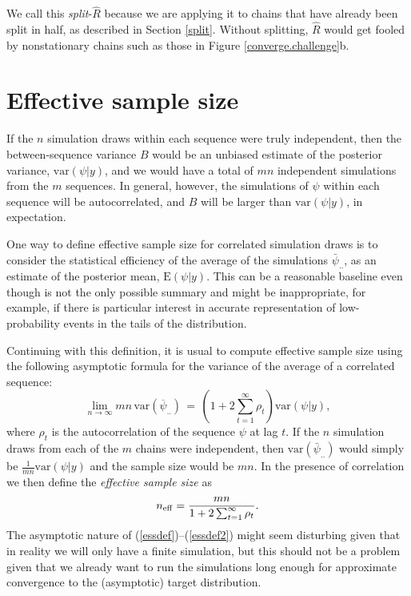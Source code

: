 \documentclass[11pt]{article}
\begin{document}
We call this {\em split}-$\widehat{R}$ because we are applying it to chains that have already been split in half, as described in Section \ref{split}.  Without splitting, $\widehat{R}$ would get fooled by nonstationary chains such as those in Figure \ref{converge.challenge}b.


\section{Effective sample size}
If the $n$ simulation draws within each sequence were truly
independent, then the between-sequence variance $B$ would be an unbiased
estimate of the posterior variance, $\mbox{var}(\psi|y)$, and we would have
a total of $mn$ independent simulations from the $m$
sequences.  In general, however, the simulations of $\psi$ within each
sequence will be autocorrelated, and $B$ will be larger than $\mbox{var}(\psi|y)$,
in expectation.

One way to define effective sample size for correlated simulation draws is to consider the statistical efficiency of the average of the simulations $\bar{\psi}_{..}$, as an estimate of the posterior mean, $\mbox{E}(\psi|y)$.  This can be a reasonable baseline even though is not the only possible summary and might be inappropriate, for example, if there is particular interest in accurate representation of low-probability events in the tails of the distribution.

Continuing with this definition, it is usual to compute effective sample size using the following asymptotic formula for the variance of the average of a correlated sequence:
\begin{equation}\label{essdef}
\lim_{n\rightarrow\infty} mn \,\mbox{var}(\overline{\psi}_{..}) \,=\,\left(1 + 2\sum_{t=1}^{\infty}\rho_t\right) \mbox{var}(\psi|y),
\end{equation}
where $\rho_t$ is the autocorrelation of the sequence $\psi$ at lag $t$.  If the $n$ simulation draws from each of the $m$ chains were independent, then $\mbox{var}(\bar{\psi}_{..})$ would simply be $\frac{1}{mn}\mbox{var}(\psi|y)$ and the sample size would be $mn$.  In the presence of correlation we then define the {\em effective sample size} as
\begin{equation}\label{essdef2}
n_{\rm eff} = \frac{mn}{1 + 2\sum_{t=1}^{\infty}\rho_t}.
\end{equation}
The asymptotic nature of (\ref{essdef})--(\ref{essdef2}) might seem disturbing given that in reality we will only have a finite simulation, but this should not be a problem given that we already want to run the simulations long enough for approximate convergence to the (asymptotic) target distribution.
\end{document}
